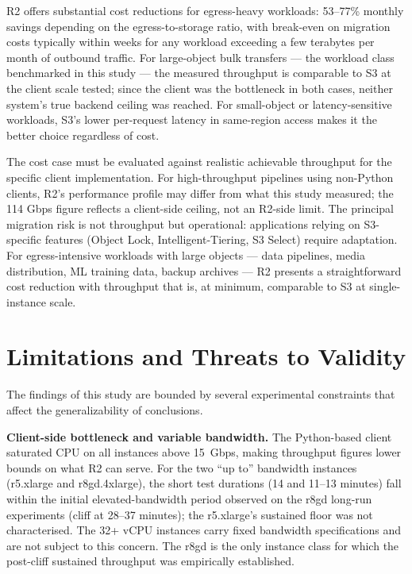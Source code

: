 R2 offers substantial cost reductions for egress-heavy workloads: 53--77\% monthly savings depending on the egress-to-storage ratio, with break-even on migration costs typically within weeks for any workload exceeding a few terabytes per month of outbound traffic. For large-object bulk transfers --- the workload class benchmarked in this study --- the measured throughput is comparable to S3 at the client scale tested; since the client was the bottleneck in both cases, neither system's true backend ceiling was reached. For small-object or latency-sensitive workloads, S3's lower per-request latency in same-region access makes it the better choice regardless of cost.

The cost case must be evaluated against realistic achievable throughput for the specific client implementation. For high-throughput pipelines using non-Python clients, R2's performance profile may differ from what this study measured; the 114 Gbps figure reflects a client-side ceiling, not an R2-side limit. The principal migration risk is not throughput but operational: applications relying on S3-specific features (Object Lock, Intelligent-Tiering, S3 Select) require adaptation. For egress-intensive workloads with large objects --- data pipelines, media distribution, ML training data, backup archives --- R2 presents a straightforward cost reduction with throughput that is, at minimum, comparable to S3 at single-instance scale.

\section{Limitations and Threats to Validity}\label{sec:limitations}

The findings of this study are bounded by several experimental constraints that affect the generalizability of conclusions.

\textbf{Client-side bottleneck and variable bandwidth.} The Python-based client saturated CPU on all instances above 15~Gbps, making throughput figures lower bounds on what R2 can serve. For the two ``up to'' bandwidth instances (r5.xlarge and r8gd.4xlarge), the short test durations (14 and 11--13 minutes) fall within the initial elevated-bandwidth period observed on the r8gd long-run experiments (cliff at 28--37 minutes); the r5.xlarge's sustained floor was not characterised. The 32+ vCPU instances carry fixed bandwidth specifications and are not subject to this concern. The r8gd is the only instance class for which the post-cliff sustained throughput was empirically established.

